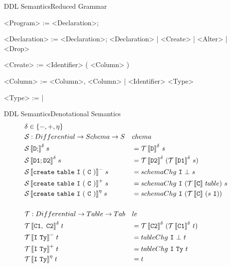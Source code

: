 \documentclass{beamer}
\newcommand{\cmp}[2]{
  \mathcal{#1}\,|[ \mathtt{ \StrSubstitute{#2}{ }{\ } } |]
}
\begin{document}
\begin{frame}[fragile]{DDL Semantics}{Reduced Grammar}
  \begin{grammar}
    <Program> := <Declaration>;

    <Declaration> := <Declaration>; <Declaration> | <Create> | <Alter> | <Drop>

    <Create> :=  <Identifier> ( <Column> )

    <Column> := <Column>, <Column> | <Identifier> <Type>

    <Type> :=  | 
  \end{grammar}
\end{frame}

\begin{frame}[fragile]{DDL Semantics}{Denotational Semantics}
  \footnotesize
  \begin{alignat*}{2}
  &\delta \in \{-, +, \eta \} &&\\
  &\mathcal{S} : Differential -> Schema -> S&&chema \\
  &\cmp{S}{D;}^{\delta}\; s &&= \cmp{T}{D}^{\delta}\ s \\
  &\cmp{S}{D1;D2}^{\delta}\; s &&= \cmp{T}{D2}^{\delta}\ (\cmp{T}{D1}^{\delta}\ s) \\
  &\cmp{S}{create table I ( C )}^{-}\; s &&= schemaChg\ \mathtt{I}\ \bot\ s\\
  &\cmp{S}{create table I ( C )}^{+}\; s &&= schemaChg\ \mathtt{I}\ (\cmp{T}{C}\ table) \ s \\
  &\cmp{S}{create table I ( C )}^{\eta}\; s &&= schemaChg\ \mathtt{I}\ (\cmp{T}{C}\ (s\ \mathtt{I})) \\
\\
  &\mathcal{T} : Differential -> Table -> Tab&&le\\
  &\cmp{T}{C1, C2}^{\delta}\; t &&= \cmp{T}{C2}^{\delta}\ (\cmp{T}{C1}^{\delta}\ t) \\
  &\cmp{T}{I Ty}^{-}\; t &&= tableChg\ \mathtt{I}\ \bot\ t\\
  &\cmp{T}{I Ty}^{+}\; t &&= tableChg\ \mathtt{I}\ \mathtt{Ty}\ t\\
  &\cmp{T}{I Ty}^{\eta}\; t &&= t \\
  \end{alignat*}
  \normalsize
\end{frame}
\end{document}
